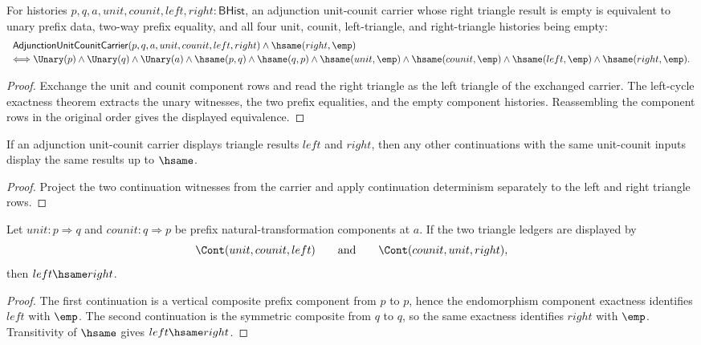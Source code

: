 \begin{theorem}
\label{thm:adjunction-unit-counit-right-cycle-empty-components}
For histories $p,q,a,unit,counit,left,right:\mathsf{BHist}$,
an adjunction unit-counit carrier whose right triangle result is empty is
equivalent to unary prefix data, two-way prefix equality, and all four
unit, counit, left-triangle, and right-triangle histories being empty:
$$
\begin{array}{l}
\mathsf{AdjunctionUnitCounitCarrier}(p,q,a,unit,counit,left,right)
\land \hsame(right,\emp)\\[2pt]
\Longleftrightarrow
\Unary(p)\land\Unary(q)\land\Unary(a)\land
\hsame(p,q)\land\hsame(q,p)\land
\hsame(unit,\emp)\land\hsame(counit,\emp)\land
\hsame(left,\emp)\land\hsame(right,\emp).
\end{array}
$$
\end{theorem}
\begin{proof}
Exchange the unit and counit component rows and read the right triangle as the
left triangle of the exchanged carrier. The left-cycle exactness theorem
extracts the unary witnesses, the two prefix equalities, and the empty
component histories. Reassembling the component rows in the original order
gives the displayed equivalence.
\end{proof}

\begin{theorem}
\label{thm:adjunction-unit-counit-triangle-results-deterministic}
If an adjunction unit-counit carrier displays triangle results $left$ and
$right$, then any other continuations with the same unit-counit inputs display
the same results up to $\hsame$.
\end{theorem}
\begin{proof}
Project the two continuation witnesses from the carrier and apply continuation
determinism separately to the left and right triangle rows.
\end{proof}

\begin{theorem}
\label{thm:adjunction-unit-counit-triangle-results-hsame}
Let \(unit:p\Rightarrow q\) and \(counit:q\Rightarrow p\) be prefix
natural-transformation components at \(a\). If the two triangle ledgers are
displayed by
$$
\Cont(unit,counit,left)
\qquad\text{and}\qquad
\Cont(counit,unit,right),
$$
then \(left\hsame right\).
\end{theorem}
\begin{proof}
The first continuation is a vertical composite prefix component from \(p\) to
\(p\), hence the endomorphism component exactness identifies \(left\) with
\(\emp\). The second continuation is the symmetric composite from \(q\) to
\(q\), so the same exactness identifies \(right\) with \(\emp\). Transitivity of
\(\hsame\) gives \(left\hsame right\).
\end{proof}

